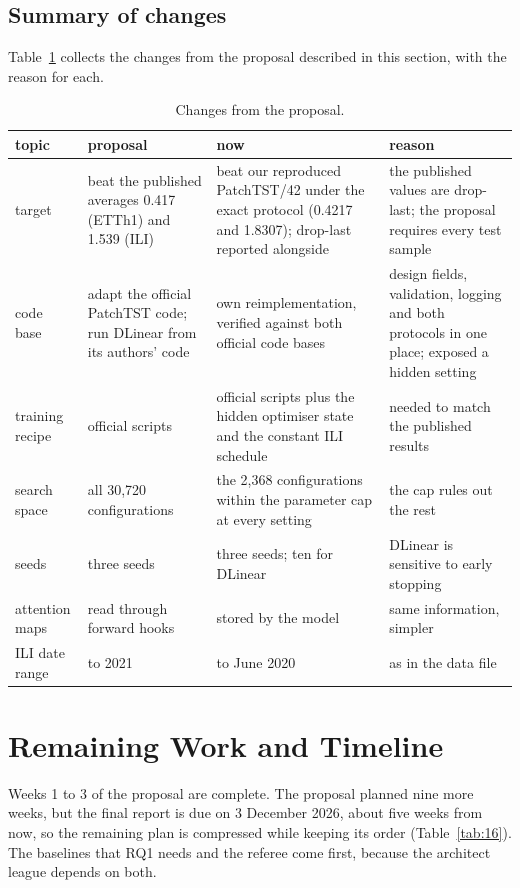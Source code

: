 \documentclass[11pt,letterpaper]{article}
\begin{document}
\subsection{Summary of changes}
Table~\ref{tab:15} collects the changes from the proposal described in this section, with the reason for each.

\begin{table}[htbp]
\centering
\caption{Changes from the proposal.}\label{tab:15}
{\footnotesize\setlength{\tabcolsep}{3pt}
\begin{tabular}{>{\raggedright\arraybackslash}p{}>{\raggedright\arraybackslash}p{}>{\raggedright\arraybackslash}p{}>{\raggedright\arraybackslash}p{}}
\toprule
\textbf{topic} & \textbf{proposal} & \textbf{now} & \textbf{reason} \\
\midrule
target & beat the published averages 0.417 (ETTh1) and 1.539 (ILI) & beat our reproduced PatchTST/42 under the exact protocol (0.4217 and 1.8307); drop-last reported alongside & the published values are drop-last; the proposal requires every test sample \\
code base & adapt the official PatchTST code; run DLinear from its authors' code & own reimplementation, verified against both official code bases & design fields, validation, logging and both protocols in one place; exposed a hidden setting \\
training recipe & official scripts & official scripts plus the hidden optimiser state and the constant ILI schedule & needed to match the published results \\
search space & all 30,720 configurations & the 2,368 configurations within the parameter cap at every setting & the cap rules out the rest \\
seeds & three seeds & three seeds; ten for DLinear & DLinear is sensitive to early stopping \\
attention maps & read through forward hooks & stored by the model & same information, simpler \\
ILI date range & 2002 to 2021 & 2002 to June 2020 & as in the data file \\
\bottomrule
\end{tabular}}
\end{table}

\section{Remaining Work and Timeline}
Weeks 1 to 3 of the proposal are complete. The proposal planned nine more weeks, but the final report is due on 3 December 2026, about five weeks from now, so the remaining plan is compressed while keeping its order (Table~\ref{tab:16}). The baselines that RQ1 needs and the referee come first, because the architect league depends on both.
\end{document}
